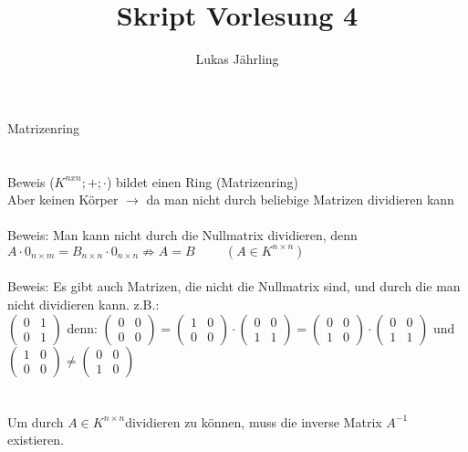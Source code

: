 \documentclass{scrartcl}
\title{Skript Vorlesung 4}
\author{Lukas Jährling}
\begin{document}
	\large
	Matrizenring
	\\
	\\
	\\
	\normalsize
	Beweis ($K^{nxn};+;\cdot$) bildet einen Ring (Matrizenring)
	\\
	Aber keinen Körper $\rightarrow$ da man nicht durch beliebige Matrizen dividieren kann
	\\
	\\
	Beweis: Man kann nicht durch die Nullmatrix dividieren, denn \\
	$A \cdot 0_{n\times m} = B_{n\times n} \cdot 0_{n\times n} \not\Rightarrow A = B \hspace{1cm} (A \in K^{n\times n} ) $
	\\
	\\
	Beweis: Es gibt auch Matrizen, die nicht die Nullmatrix sind, und durch die man nicht dividieren kann. z.B.:
	\\
	
	\hspace{0cm}
	$\begin{pmatrix}
		0 & 1 \\ 0 & 1
	\end{pmatrix}$ denn:
	$\begin{pmatrix} 
		0 & 0 \\ 0 & 0
	\end{pmatrix}
	=
	\begin{pmatrix}
		1 & 0 \\ 0 & 0
	\end{pmatrix}
	\cdot
	\begin{pmatrix}
		0 & 0 \\ 1  & 1
	\end{pmatrix}
	=
	\begin{pmatrix}
		0 & 0 \\ 1 & 0
	\end{pmatrix}
	\cdot
	\begin{pmatrix}
		0 & 0 \\ 1 & 1
	\end{pmatrix}
	$
	und
	$
	\begin{pmatrix}
		1 & 0 \\ 0 & 0
	\end{pmatrix}
	\not = 
	\begin{pmatrix}
		0 & 0 \\ 1 & 0
	\end{pmatrix}$
	\\
	\\
	\\
	Um durch $A \in K^{n\times n} $dividieren zu können, muss die inverse Matrix $A^{-1}$ existieren.
\end{document}
